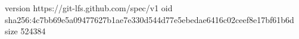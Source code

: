 version https://git-lfs.github.com/spec/v1
oid sha256:4c7bb69e5a09477627b1ae7e330d544d77e5ebedae6416c02ceef8e17bf61b6d
size 524384
